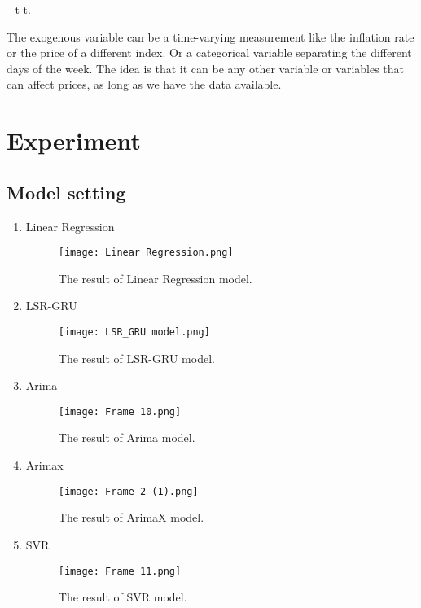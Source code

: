\documentclass{ieeeojies}
\begin{document}
\epsilon_t  t.

The exogenous variable can be a time-varying measurement like the inflation rate or the price of a different index. Or a categorical variable separating the different days of the week.  The idea is that it can be any other variable or variables that can affect prices, as long as we have the data available.
\section{Experiment}
\subsection{Model setting}
\begin{enumerate}
\item Linear Regression
\vspace{-20pt}
\begin{figure}[!ht]
      \centering
      \texttt{[image: Linear Regression.png]} 
      \caption{The result of Linear Regression model.}
      \label{fig:ten_anh}
    \end{figure}

\item LSR-GRU
\begin{figure}[!ht]
      \centering
      \texttt{[image: LSR\_GRU model.png]} 
      \caption{The result of LSR-GRU model.}
      \label{fig:ten_anh}
    \end{figure}
 \vspace{200pt}   
\item Arima
\begin{figure}[!ht]
      \centering
      \texttt{[image: Frame 10.png]} 
      \caption{The result of Arima model.}
      \label{fig:ten_anh}
    \end{figure}

\item Arimax 
\begin{figure}[!ht]
      \centering
      \texttt{[image: Frame 2 (1).png]} 
      \caption{The result of ArimaX model.}
      \label{fig:ten_anh}
    \end{figure}
\vspace{150pt}
\item SVR
\begin{figure}[!ht]
      \centering
      \texttt{[image: Frame 11.png]} 
      \caption{The result of SVR model.}
      \label{fig:ten_anh}
    \end{figure}



\end{enumerate}
\end{document}
